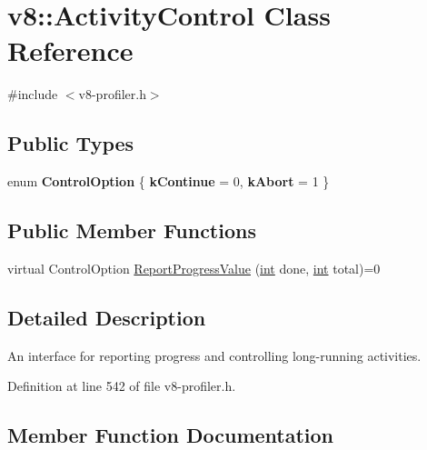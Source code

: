 \hypertarget{classv8_1_1ActivityControl}{}\section{v8\+:\+:Activity\+Control Class Reference}
\label{classv8_1_1ActivityControl}


{\ttfamily \#include $<$v8-\/profiler.\+h$>$}

\subsection*{Public Types}
\begin{DoxyCompactItemize}
\item 
\mbox{\label{classv8_1_1ActivityControl_a6d261e8c21e8076ce86b4add231a8ef9}} 
enum {\bfseries Control\+Option} \{ {\bfseries k\+Continue} = 0, 
{\bfseries k\+Abort} = 1
 \}
\end{DoxyCompactItemize}
\subsection*{Public Member Functions}
\begin{DoxyCompactItemize}
\item 
virtual Control\+Option \mbox{\hyperlink{classv8_1_1ActivityControl_a1300f10611306a3e8f79239e057eb0bf}{Report\+Progress\+Value}} (\mbox{\hyperlink{classint}{int}} done, \mbox{\hyperlink{classint}{int}} total)=0
\end{DoxyCompactItemize}


\subsection{Detailed Description}
An interface for reporting progress and controlling long-\/running activities. 

Definition at line 542 of file v8-\/profiler.\+h.



\subsection{Member Function Documentation}
\mbox{\label{classv8_1_1ActivityControl_a1300f10611306a3e8f79239e057eb0bf}} 
